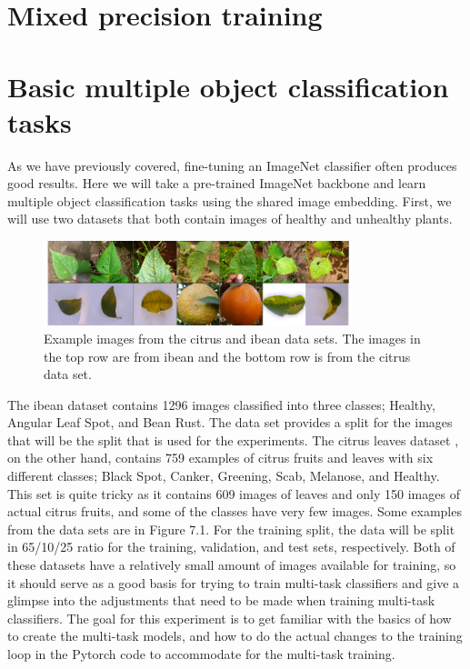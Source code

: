 \section{Mixed precision training}

\section{Basic multiple object classification tasks}
As we have previously covered, fine-tuning an ImageNet classifier often produces good results.
Here we will take a pre-trained ImageNet backbone and learn multiple object classification tasks using the shared image embedding.
First, we will use two datasets that both contain images of healthy and unhealthy plants.

\begin{figure}[h!]
    \centering
    \includegraphics[width=0.8\textwidth]{imgs/citrus_beans_examples.png}
    \caption{Example images from the citrus and ibean data sets.
        The images in the top row are from ibean and the bottom row is from the citrus data set.}
\end{figure}

The ibean dataset \citep{beansdata} contains 1296 images classified into three classes; Healthy, Angular Leaf Spot, and Bean Rust.
The data set provides a split for the images that will be the split that is used for the experiments.
The citrus leaves dataset \citep{citrusdata}, on the other hand, contains 759 examples of citrus fruits and leaves with six different classes; Black Spot, Canker, Greening, Scab, Melanose, and Healthy.
This set is quite tricky as it contains 609 images of leaves and only 150 images of actual citrus fruits, and some of the classes have very few images.
Some examples from the data sets are in Figure 7.1.
For the training split, the data will be split in 65/10/25 ratio for the training, validation, and test sets, respectively.
Both of these datasets have a relatively small amount of images available for training, so it should serve as a good basis for trying to train multi-task classifiers and give a glimpse into the adjustments that need to be made when training multi-task classifiers.
The goal for this experiment is to get familiar with the basics of how to create the multi-task models, and how to do the actual changes to the training loop in the Pytorch code to accommodate for the multi-task training.

